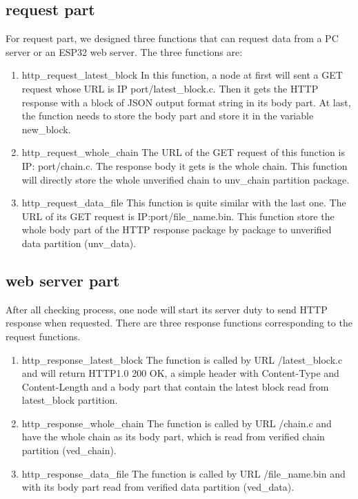 \documentclass{article}
\begin{document}
	\subsection{request part}
        For request part, we designed three functions that can request data from a PC server or an ESP32 web server. The three functions are:
        \begin{enumerate}
            \item http\_request\_latest\_block
            In this function, a node at first will sent a GET request whose URL is IP\: port/latest\_block.c. Then it gets the HTTP response with a block of JSON output format string in its body part. At last, the function needs to store the body part and store it in the variable new\_block.

            \item http\_request\_whole\_chain
            The URL of the GET request of this function is IP: port/chain.c. The response body it gets is the whole chain. This function will directly store the whole unverified chain to unv\_chain partition package.

            \item http\_request\_data\_file
            This function is quite similar with the last one. The URL of its GET request is IP:port/file\_name.bin. This function store the whole body part of the HTTP response package by package to unverified data partition (unv\_data).
        \end{enumerate}


    \subsection{web server part}
        After all checking process, one node will start its server duty to send HTTP response when requested. There are three response functions corresponding to the request functions.
        \begin{enumerate}
            \item http\_response\_latest\_block
            The function is called by URL /latest\_block.c and will return HTTP1.0 200 OK, a simple header with Content-Type and Content-Length and a body part that contain the latest block read from latest\_block partition.
            \item http\_response\_whole\_chain
            The function is called by URL /chain.c and have the whole chain as its body part, which is read from verified chain partition (ved\_chain).
            \item http\_response\_data\_file
            The function is called by URL /file\_name.bin and with its body part read from verified data partition (ved\_data).
         \end{enumerate}
\end{document}
